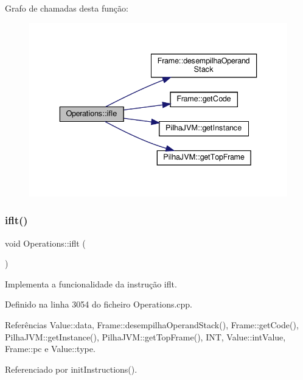 Grafo de chamadas desta função\+:\nopagebreak
\begin{figure}[H]
\begin{center}
\leavevmode
\includegraphics[width=336pt]{classOperations_a1ef1754372db2e5285a129389274dcc8_cgraph}
\end{center}
\end{figure}
\mbox{\label{classOperations_a0a9460ea938fc3a9bbd2102578d50ee2}} 
\subsubsection{\texorpdfstring{iflt()}{iflt()}}
{\footnotesize\ttfamily void Operations\+::iflt (\begin{DoxyParamCaption}{ }\end{DoxyParamCaption})\hspace{0.3cm}{\ttfamily [private]}}



Implementa a funcionalidade da instrução iflt. 



Definido na linha 3054 do ficheiro Operations.\+cpp.



Referências Value\+::data, Frame\+::desempilha\+Operand\+Stack(), Frame\+::get\+Code(), Pilha\+J\+V\+M\+::get\+Instance(), Pilha\+J\+V\+M\+::get\+Top\+Frame(), I\+NT, Value\+::int\+Value, Frame\+::pc e Value\+::type.



Referenciado por init\+Instructions().

